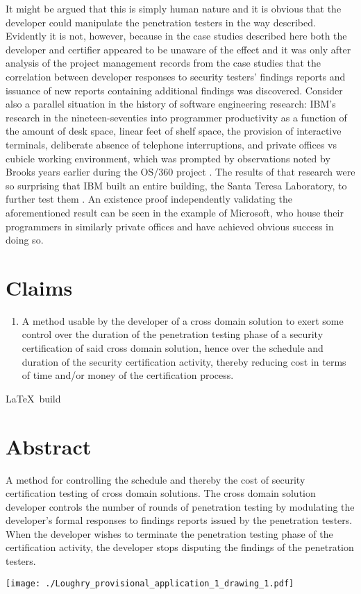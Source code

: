 \documentclass[12pt,letterpaper]{article}
\begin{document}
It might be argued that this is simply human nature and it is obvious that the developer
could manipulate the penetration testers in the way described.  Evidently it is not,
however, because in the case studies described here \cite[Chapters 4--5]{Loughry2012b} both
the developer and certifier appeared to be unaware of the effect and it was only after analysis
of the project management records from the case studies that the correlation between developer
responses to
security testers' findings reports and issuance of new reports containing additional findings
was discovered.  Consider also a parallel situation in the history of software engineering
research: IBM's research in the nineteen-seventies into programmer productivity as a function
of the amount of desk space, linear feet of shelf space, the provision of interactive terminals,
deliberate absence of telephone interruptions, and private offices vs cubicle working environment,
which was prompted by observations noted by Brooks years earlier during the OS/360 project
\cite{Brooks1995}.  The results of that research were so surprising
that IBM built an entire building, the Santa Teresa Laboratory, to further test them
\cite{DeMarco1999,McCue1978}.  An existence proof independently validating the aforementioned
result can be seen in the example of Microsoft, who house their programmers in similarly
private offices and have achieved obvious success in doing so.

\newpage
\section*{Claims}

\begin{enumerate}
	\item A method usable by the developer of a cross domain solution to exert some control
		over the duration of the penetration testing phase of a security certification of
		said cross domain solution, hence over the schedule and duration of the security
		certification activity, thereby reducing cost in terms of time and/or money of
		the certification process.
\end{enumerate}

\newpage


\vfill\noindent
{\tiny \LaTeX\ build }

\newpage

\section*{Abstract}

A method for controlling the schedule and thereby the cost of security certification testing
of cross domain solutions.  The cross domain solution developer controls the number of rounds
of penetration testing by modulating the developer's formal responses to findings reports
issued by the penetration testers.  When the developer wishes to terminate the penetration
testing phase of the certification activity, the developer stops disputing the findings of
the penetration testers.

\newpage

\texttt{[image: ./Loughry\_provisional\_application\_1\_drawing\_1.pdf]}
\end{document}
